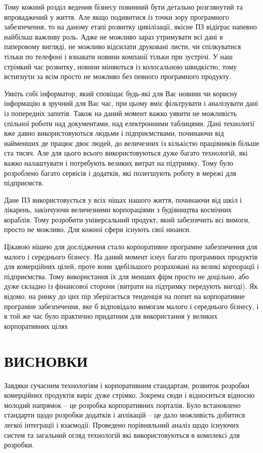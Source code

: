 Тому кожний розділ ведення бізнесу повинний бути детально розглянутий та впроваджений у життя. 
Але якщо подивитися із точки зору програмного забезпечення, то на даному етапі розвитку цивілізації, якісне ПЗ відіграє напевно найбільш важливу роль. 
Адже не можливо зараз утримувати всі дані в паперовому вигляді, не можливо відсилати друковані листи, чи спілкуватися тільки по телефоні і взнавати новини компанії тільки при зустрічі. 
У наш стрімкий час розвитку, новини міняються із колосальною швидкістю, тому встигнути за всім просто не можливо без певного програмного продукту. 
\par Уявіть собі інформатор, який сповіщає будь-які для Вас новини чи корисну інформацію в зручний для Вас час, при цьому вміє фільтрувати і аналізувати дані із попередніх запитів. 
Також на даний момент важко уявити не можливість спільної роботи над документами, над електронними таблицями. 
Дані технології вже давно використовуються людьми і підприємствами, починаючи від найменших де працює двоє людей, до величезних із кількістю працівників більше ста тисяч. 
Але для цього всього використовуються дуже багато технологій, які важко налаштувати і потребують великих витрат на підтримку.
Тому було розроблено багато сервісів і додатків, які полегшують роботу в мережі для підприємств.
\par Дане ПЗ використовується у всіх нішах нашого життя, починаючи від шкіл і лікарень, закінчуючи величезними корпораціями з будівництва космічних кораблів. 
Тому розробити універсальний продукт, який забезпечить всі вимоги, просто не можливо. 
Для кожної сфери існують свої нюанси.
\par Цікавою нішею для дослідження стало корпоративне програмне забезпечення для малого і середнього бізнесу.
 На даний момент існує багато програмних продуктів для комерційних цілей, проте вони здебільшого розраховані на великі корпорації і підприємства.
Тому використання їх для менших фірм просто не доцільно, або дуже складно із фінансової сторони (витрати на підтримку передують вигоді).
Як відомо, на ринку до цих пір зберігається тенденція на попит на корпоративне програмне забезпечення, яке б відповідало вимогам малого і середнього бізнесу, і в той же час було практично придатним для використання у великих корпоративних цілях


% 
% 
% 
% 



\section*{ВИСНОВКИ}
Завдяки сучасним технологіям і корпоративним стандартам, розвиток розробки комерційних продуктів виріс дуже стрімко. 
Зокрема сюди і відноситься відносно молодий напрямок -- це розробка корпоративних порталів. 
Було встановлено стандарти щодо розробки додатків і аплікацій -- це дало можливість добитися легкої інтеграції і взаємодії. 
Проведено порівняльний аналіз щодо існуючих систем та загальний огляд технологій які використовуються в комплексі для розробки.

